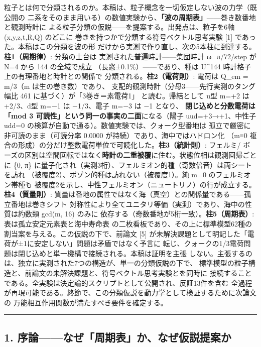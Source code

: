 \documentclass[
]{ltjsarticle}
\begin{document}
粒子とは何で分類されるのか。本稿は、粒子概念を一切仮定しない波の力学（既公開の
二系をそのまま用いる）の数値実験から、\textbf{「波の周期表」}------巻き数番地と観測時計に
よる粒子分類の仮説------を提案する。出発点は、粒子を6軸 (x,y,z,t,R,Q)
のどこに 巻きを持つかで分類する符号ベクトル思考実験 {[}1{]}
であった。本稿はこの分類を波の形
だけから実測で作り直し、次の5本柱に到達する。\textbf{柱1（周期律）}:
分類の土台は 実測された普遍時計------集団時計 ω=π/72/step が N=4 から
144 の全域で成立 （長窓±0.1\%）------であり、種は U\^{}144
時計格子上の有理番地と時計との関係で 分類される。\textbf{柱2（電荷則）}:
電荷は Q\_em = m/3（m は生の巻き数）であり、
支配的観測時計（分母3------先行実測のタング幅比 461
に基づく）が「3巻き＝素電荷1」 と読む。帰結として u型 m=+2 は +2/3、d型
m=−1 は −1/3、電子 m=−3 は −1 となり、 \textbf{閉じ込めと分数電荷は「mod
3 可読性」という同一の事実の二面}になる（陽子 uud=+3→+1、中性子 udd=0
の検算が自動で通る）。数値実験では、クォーク型番地は
孤立で厳密に非可読のまま（可読分率 0.0000
が持続）であり、海中ではハドロン化 （m≡0
複合の形成）の分だけ整数電荷単位で可読化した。\textbf{柱3（統計則）}:
フェルミ/
ボーズの区別は空間回転ではなく\textbf{時計の二重被覆}に住む。状態位相は観測回帰ごとに
\{0, π\}
に量子化され（実測3桁）、フェルミオン的種（奇数倍音）は両シートを訪れ
（被覆度2）、ボゾン的種は訪れない（被覆度1）。純 m=0
のフェルミオン帯種も
被覆度2を示し、中性フェルミオン（ニュートリノ）の行が成立する。\textbf{柱4（質量則）}:
質量は番地の属性ではなく海（真空）との関係量である------孤立番地は巻きシフト
対称性により全てユニタリ等価（実測）であり、海中の性質は約数類 gcd(m,
16) のみに 依存する（奇数番地が5桁一致）。\textbf{柱5（周期表）}:
表は孤立安定元素表と海中寿命表
の二枚看板であり、その上に標準模型62種の割当案を与える。この仮説の下で、前論文
{[}5{]}
が未解決課題として明記した「電荷が±1に安定しない」問題は矛盾ではなく予言に
転じ、クォークの1/3電荷問題は閉じ込めと単一機構で接続される。本稿は証明を主張
しない。主張するのは、独立に実測された7つの構造が、単一の分類仮説の下で、
標準模型の粒子構造と、前論文の未解決課題と、符号ベクトル思考実験とを同時に
接続することである。全実験は決定論的スクリプトとして公開され、反証13件を含む
全過程が再現可能である。終節で、この分類仮説を動力学として検証するために次論文の
万能相互作用関数が満たすべき要件を確定する。

\begin{center}\rule{0.5\linewidth}{0.5pt}\end{center}

\subsection{1.
序論------なぜ「周期表」か、なぜ仮説提案か}\label{ux5e8fux8ad6ux306aux305cux5468ux671fux8868ux304bux306aux305cux4eeeux8aacux63d0ux6848ux304b}
\end{document}
